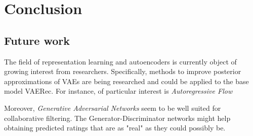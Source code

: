 \chapter{Conclusion}

\section{Future work}

The field of representation learning and autoencoders is currently object of
growing interest from researchers. Specifically, methods to improve posterior
approximations of VAEs are being researched and could be applied to the base model
VAERec. For instance, of particular interest is \emph{Autoregressive Flow}
\cite{autoregressive_flow}

Moreover, \emph{Generative Adversarial Networks} \cite{GAN} seem to be well suited 
for collaborative filtering. The Generator-Discriminator networks might help
obtaining predicted ratings that are as "real" as they could possibly be.

